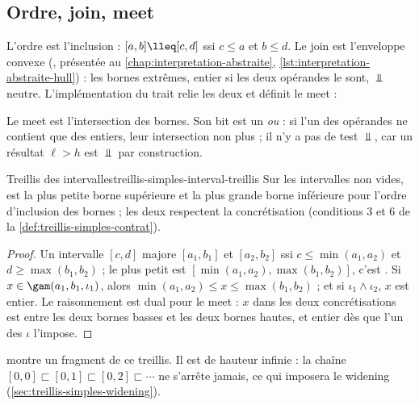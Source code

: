 \subsection{Ordre, join, meet}


L'ordre est l'inclusion : $[a,b] \lleq [c,d]$ ssi $c \le a$ et $b \le d$. Le
join est l'enveloppe convexe (, présentée au
\cref{chap:interpretation-abstraite},
\cref{lst:interpretation-abstraite-hull}) : les bornes extrêmes, entier si
les deux opérandes le sont, $\Bot$ neutre. L'implémentation du trait relie les
deux et définit le meet :


Le meet est l'intersection des bornes. Son bit est un \emph{ou} : si l'un des
opérandes ne contient que des entiers, leur intersection non plus ; il n'y a
pas de test $\Bot$, car un résultat $\ell > h$ est $\Bot$ par construction.

\begin{proposition}{Treillis des intervalles}{treillis-simples-interval-treillis}
  Sur les intervalles non vides,  est la plus petite borne
  supérieure et  la plus grande borne inférieure pour l'ordre
  d'inclusion des bornes ; les deux respectent la concrétisation
  (conditions 3 et 6 de la \cref{def:treillis-simples-contrat}).
\end{proposition}
\begin{proof}
  Un intervalle $[c,d]$ majore $[a_1,b_1]$ et $[a_2,b_2]$ ssi
  $c \le \min(a_1,a_2)$ et $d \ge \max(b_1,b_2)$ ; le plus petit est
  $[\min(a_1,a_2), \max(b_1,b_2)]$, c'est . Si $x \in
  \gam(a_1,b_1,\iota_1)$, alors $\min(a_1,a_2) \le x \le \max(b_1,b_2)$ ; et si
  $\iota_1 \wedge \iota_2$, $x$ est entier. Le raisonnement est dual pour le
  meet : $x$ dans les deux concrétisations est entre les deux bornes basses et
  les deux bornes hautes, et entier dès que l'un des $\iota$ l'impose.
\end{proof}

 montre un fragment de ce
treillis. Il est de hauteur infinie : la chaîne $[0,0] \sqsubset [0,1]
\sqsubset [0,2] \sqsubset \cdots$ ne s'arrête jamais, ce qui imposera le
widening (\cref{sec:treillis-simples-widening}).

